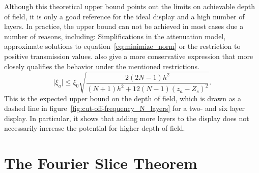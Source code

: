 Although this theoretical upper bound points out the limits on achievable depth of field, it is only a good reference for the ideal display and a high number of layers.
In practice, the upper bound can not be achieved in most cases due a number of reasons, including: 
Simplifications in the attenuation model, approximate solutions to equation~\ref{eq:minimize_norm} or the restriction to positive transmission values.
\cite{WetzsteinTomo} also give a more conservative expression that more closely qualifies the behavior under the mentioned restrictions.
\begin{equation}\label{eq:expected_upper_bound_spatial_cut_off}
	\lvert \xi_a \rvert \leq \xi_0 \sqrt{ \frac{2(2N - 1) h^2}{(N + 1) h^2 + 12(N - 1)(z_a - Z_s)^2} }.
\end{equation}
This is the expected upper bound on the depth of field, which is drawn as a dashed line in figure~\ref{fig:cut-off-frequency_N_layers} for a two- and six layer display.
In particular, it shows that adding more layers to the display does not necessarily increase the potential for higher depth of field.

\section{The Fourier Slice Theorem}

